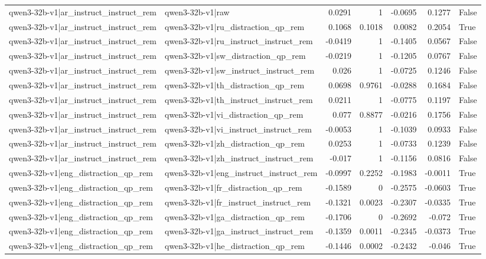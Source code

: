 \begin{table}
\begin{tabular}{l l r r r r l}
qwen3-32b-v1|ar_instruct_instruct_rem & qwen3-32b-v1|raw & 0.0291 & 1 & -0.0695 & 0.1277 & False \\
qwen3-32b-v1|ar_instruct_instruct_rem & qwen3-32b-v1|ru_distraction_qp_rem & 0.1068 & 0.1018 & 0.0082 & 0.2054 & True \\
qwen3-32b-v1|ar_instruct_instruct_rem & qwen3-32b-v1|ru_instruct_instruct_rem & -0.0419 & 1 & -0.1405 & 0.0567 & False \\
qwen3-32b-v1|ar_instruct_instruct_rem & qwen3-32b-v1|sw_distraction_qp_rem & -0.0219 & 1 & -0.1205 & 0.0767 & False \\
qwen3-32b-v1|ar_instruct_instruct_rem & qwen3-32b-v1|sw_instruct_instruct_rem & 0.026 & 1 & -0.0725 & 0.1246 & False \\
qwen3-32b-v1|ar_instruct_instruct_rem & qwen3-32b-v1|th_distraction_qp_rem & 0.0698 & 0.9761 & -0.0288 & 0.1684 & False \\
qwen3-32b-v1|ar_instruct_instruct_rem & qwen3-32b-v1|th_instruct_instruct_rem & 0.0211 & 1 & -0.0775 & 0.1197 & False \\
qwen3-32b-v1|ar_instruct_instruct_rem & qwen3-32b-v1|vi_distraction_qp_rem & 0.077 & 0.8877 & -0.0216 & 0.1756 & False \\
qwen3-32b-v1|ar_instruct_instruct_rem & qwen3-32b-v1|vi_instruct_instruct_rem & -0.0053 & 1 & -0.1039 & 0.0933 & False \\
qwen3-32b-v1|ar_instruct_instruct_rem & qwen3-32b-v1|zh_distraction_qp_rem & 0.0253 & 1 & -0.0733 & 0.1239 & False \\
qwen3-32b-v1|ar_instruct_instruct_rem & qwen3-32b-v1|zh_instruct_instruct_rem & -0.017 & 1 & -0.1156 & 0.0816 & False \\
qwen3-32b-v1|eng_distraction_qp_rem & qwen3-32b-v1|eng_instruct_instruct_rem & -0.0997 & 0.2252 & -0.1983 & -0.0011 & True \\
qwen3-32b-v1|eng_distraction_qp_rem & qwen3-32b-v1|fr_distraction_qp_rem & -0.1589 & 0 & -0.2575 & -0.0603 & True \\
qwen3-32b-v1|eng_distraction_qp_rem & qwen3-32b-v1|fr_instruct_instruct_rem & -0.1321 & 0.0023 & -0.2307 & -0.0335 & True \\
qwen3-32b-v1|eng_distraction_qp_rem & qwen3-32b-v1|ga_distraction_qp_rem & -0.1706 & 0 & -0.2692 & -0.072 & True \\
qwen3-32b-v1|eng_distraction_qp_rem & qwen3-32b-v1|ga_instruct_instruct_rem & -0.1359 & 0.0011 & -0.2345 & -0.0373 & True \\
qwen3-32b-v1|eng_distraction_qp_rem & qwen3-32b-v1|he_distraction_qp_rem & -0.1446 & 0.0002 & -0.2432 & -0.046 & True \\

\end{tabular}
\end{table}
